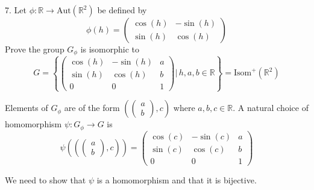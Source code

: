 \documentclass[11pt]{article}
\newcommand{\R}{\mathbb{R}}
\newcommand{\Aut}{\text{Aut}}
\newcommand{\lra}{\longrightarrow}
\begin{document}
	\color{black}


\pagebreak 

7.  Let $\phi: \R \lra \Aut(\R^{2})$ be defined by 
\[\phi(h) = \begin{pmatrix}
  \cos(h) &-\sin(h)\\
  \sin(h) &\cos(h)
\end{pmatrix}\]
Prove the group $G_{\phi}$ is isomorphic to 
\[
G=
\left\{
\left(\begin{array}{ccc}
\cos(h) &-\sin(h) & a\\ 
\sin(h) &\cos(h) & b\\
0 & 0 & 1
\end{array}
\right) \bigg| \, h,a,b \in \R
\right\} = \text{Isom}^{+}(\R^{2})
\]

	\color{blue}
		Elements of $G_{\phi}$ are of the form $(\begin{pmatrix}
			a\\b
		\end{pmatrix}, c)$ where $a, b, c \in \R$. A natural choice of homomorphism $\psi: G_{\phi} \to G$ is 
		\[\psi((\begin{pmatrix}
			a\\b
		\end{pmatrix}, c)) = \begin{pmatrix} 
			\cos(c) & -\sin(c) & a\\
			\sin(c) & \cos(c) & b\\
			0 & 0 & 1
		\end{pmatrix}\]

		We need to show that $\psi$ is a homomorphism and that it is bijective.
\end{document}
